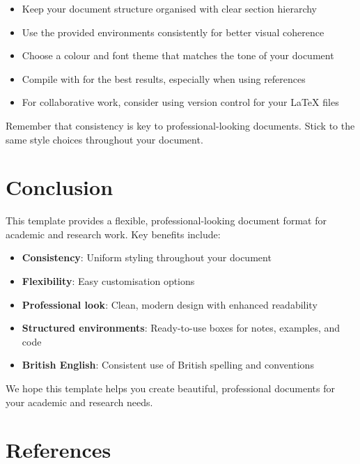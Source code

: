 \documentclass[a4paper,11pt]{article}
\begin{document}
\begin{itemize}
    \item Keep your document structure organised with clear section hierarchy
    \item Use the provided environments consistently for better visual coherence
    \item Choose a colour and font theme that matches the tone of your document
    \item Compile with  for the best results, especially when using references
    \item For collaborative work, consider using version control for your LaTeX files
\end{itemize}

\begin{notetbox}
    Remember that consistency is key to professional-looking documents. Stick to the same style choices throughout your document.
\end{notetbox}

\section{Conclusion}
This template provides a flexible, professional-looking document format for academic and research work. Key benefits include:

\begin{itemize}
    \item \textbf{Consistency}: Uniform styling throughout your document
    \item \textbf{Flexibility}: Easy customisation options
    \item \textbf{Professional look}: Clean, modern design with enhanced readability
    \item \textbf{Structured environments}: Ready-to-use boxes for notes, examples, and code
    \item \textbf{British English}: Consistent use of British spelling and conventions
\end{itemize}

We hope this template helps you create beautiful, professional documents for your academic and research needs.

\section{References}
\printbibliography[heading=none]
\end{document}
